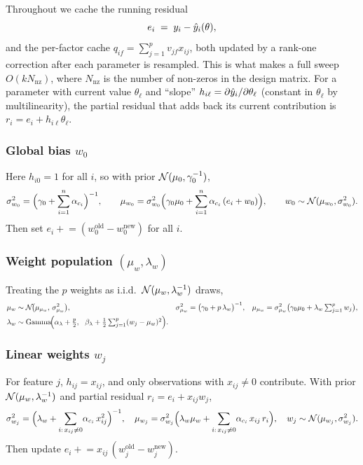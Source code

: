 Throughout we cache the running residual
\begin{equation}
  e_i \;=\; y_i - \hat{y}_i(\theta),
  \label{eq:resid}
\end{equation}
and the per-factor cache $q_{if}=\sum_{j=1}^{p} v_{jf}x_{ij}$, both updated by a
rank-one correction after each parameter is resampled. This is what makes a full
sweep $O(k N_{\mathrm{nz}})$, where $N_{\mathrm{nz}}$ is the number of non-zeros
in the design matrix. For a parameter with current value $\theta_\ell$ and
``slope'' $h_{i\ell}=\partial \hat{y}_i/\partial\theta_\ell$ (constant in
$\theta_\ell$ by multilinearity), the partial residual that adds back its current
contribution is $r_{i}=e_i+h_{i\ell}\theta_\ell$.

\subsubsection{Global bias $w_0$}
Here $h_{i0}=1$ for all $i$, so with prior $\mathcal{N}(\mu_0,\gamma_0^{-1})$,
\begin{equation}
  \sigma_{w_0}^2=\Big(\gamma_0+\sum_{i=1}^{n}\alpha_{c_i}\Big)^{-1},
  \qquad
  \mu_{w_0}=\sigma_{w_0}^2\Big(\gamma_0\mu_0+\sum_{i=1}^{n}\alpha_{c_i}\,(e_i+w_0)\Big),
  \qquad
  w_0 \sim \mathcal{N}(\mu_{w_0},\sigma_{w_0}^2).
\end{equation}
Then set $e_i \mathrel{+}= (w_0^{\mathrm{old}}-w_0^{\mathrm{new}})$ for all $i$.

\subsubsection{Weight population $(\mu_w,\lambda_w)$}
Treating the $p$ weights as i.i.d.\ $\mathcal{N}(\mu_w,\lambda_w^{-1})$ draws,
\begin{align}
  \mu_w &\sim \mathcal{N}\!\big(\mu_{\mu_w},\,\sigma_{\mu_w}^2\big),
  & \sigma_{\mu_w}^2 &=\big(\gamma_0+p\,\lambda_w\big)^{-1},
  & \mu_{\mu_w} &=\sigma_{\mu_w}^2\big(\gamma_0\mu_0+\lambda_w\textstyle\sum_{j=1}^{p}w_j\big), \\
  \lambda_w &\sim \mathrm{Gamma}\!\Big(\alpha_\lambda+\tfrac{p}{2},\ \
     \beta_\lambda+\tfrac{1}{2}\textstyle\sum_{j=1}^{p}(w_j-\mu_w)^2\Big).
\end{align}

\subsubsection{Linear weights $w_j$}
For feature $j$, $h_{ij}=x_{ij}$, and only observations with $x_{ij}\neq 0$
contribute. With prior $\mathcal{N}(\mu_w,\lambda_w^{-1})$ and partial residual
$r_i=e_i+x_{ij}w_j$,
\begin{equation}
  \sigma_{w_j}^2=\Big(\lambda_w+\sum_{i:\,x_{ij}\neq0}\!\alpha_{c_i}\,x_{ij}^2\Big)^{-1},
  \quad
  \mu_{w_j}=\sigma_{w_j}^2\Big(\lambda_w\mu_w+\sum_{i:\,x_{ij}\neq0}\!\alpha_{c_i}\,x_{ij}\,r_i\Big),
  \quad
  w_j\sim\mathcal{N}(\mu_{w_j},\sigma_{w_j}^2).
\end{equation}
Then update $e_i \mathrel{+}= x_{ij}\,(w_j^{\mathrm{old}}-w_j^{\mathrm{new}})$.

